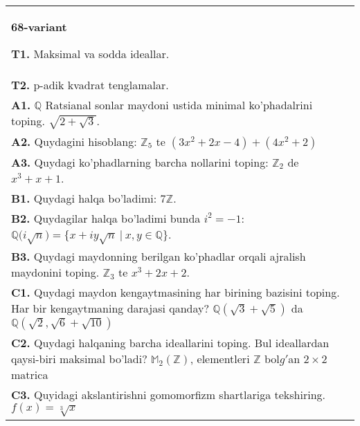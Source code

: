 \documentclass{article}
\begin{document}
\begin{tabular}{m{17cm}}
\textbf{68-variant}
\newline

\textbf{T1.} Maksimal va sodda ideallar. \\
\textbf{T2.} p-adik kvadrat tenglamalar. \\
\textbf{A1.} \(\mathbb{Q}\) Ratsianal sonlar maydoni ustida minimal ko'phadalrini toping.
\(\sqrt{2 + \sqrt{3}}\). \\
\textbf{A2.} Quydagini hisoblang:
\(\mathbb{Z}_{5}\) te \(\left( 3x^{2} + 2x - 4 \right) + \left( 4x^{2} + 2 \right)\) \\
\textbf{A3.} Quydagi ko'phadlarning barcha nollarini toping:
\(\mathbb{Z}_{2}\) de \(x^{3} + x + 1\). \\
\textbf{B1.} Quydagi halqa bo'ladimi:
\(7\mathbb{Z}\). \\
\textbf{B2.} Quydagilar halqa bo'ladimi bunda \(i^{2} = - 1\):
\(\mathbb{Q(}i\sqrt{n}) = \{ x + iy\sqrt{n}\ |\ x,y \in \mathbb{Q\}}\). \\
\textbf{B3.} Quydagi maydonning berilgan ko'phadlar orqali ajralish maydonini toping.
\(\mathbb{Z}_{3}\) te \(x^{3} + 2x + 2\). \\
\textbf{C1.} Quydagi maydon kengaytmasining har birining bazisini toping. Har bir kengaytmaning darajasi qanday?
\(\mathbb{Q}\left( \sqrt{3} + \sqrt{5} \right)\) da \(\mathbb{Q}\left( \sqrt{2},\sqrt{6} + \sqrt{10} \right)\) \\
\textbf{C2.} Quydagi halqaning barcha ideallarini toping. Bul ideallardan qaysi-biri maksimal bo'ladi?
\(\mathbb{M}_{2}\left( \mathbb{Z} \right)\), elementleri \(\mathbb{Z}\) bol\(g'\)an \(2 \times 2\) matrica \\
\textbf{C3.} Quyidagi akslantirishni gomomorfizm shartlariga tekshiring. \(f(x) = \sqrt[3]{x}\) \\

\end{tabular}
\vspace{1cm}
\end{document}
